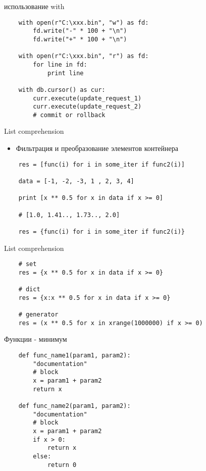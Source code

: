 \documentclass{article}
\begin{document}
\begin{center} использование with \end{center}
\vspace{15pt}
\begin{lstlisting}
	with open(r"C:\xxx.bin", "w") as fd:
	    fd.write("-" * 100 + "\n")
	    fd.write("+" * 100 + "\n")

	with open(r"C:\xxx.bin", "r") as fd:
	    for line in fd:
	    	print line

	with db.cursor() as cur:
	    curr.execute(update_request_1)
	    curr.execute(update_request_2)
		# commit or rollback
\end{lstlisting}
\newpage

\begin{center} List comprehension \end{center}
\vspace{15pt}
\begin{itemize}
	\item Фильтрация и преобразование элементов контейнера
\end{itemize}
\begin{lstlisting}
	res = [func(i) for i in some_iter if func2(i)]

	data = [-1, -2, -3, 1 , 2, 3, 4]

	print [x ** 0.5 for x in data if x >= 0]

	# [1.0, 1.41.., 1.73.., 2.0]

	res = {func(i) for i in some_iter if func2(i)}
\end{lstlisting}
\newpage

\begin{center} List comprehension \end{center}
\begin{lstlisting}
	# set 
	res = {x ** 0.5 for x in data if x >= 0}

	# dict
	res = {x:x ** 0.5 for x in data if x >= 0}

	# generator
	res = (x ** 0.5 for x in xrange(1000000) if x >= 0)
\end{lstlisting}
\newpage

\begin{center} Функции - минимум \end{center}
\begin{lstlisting}
	def func_name1(param1, param2):
		"documentation"
		# block
		x = param1 + param2
		return x

	def func_name2(param1, param2):
		"documentation"
		# block
		x = param1 + param2
		if x > 0:
			return x
		else:
			return 0
\end{lstlisting}
\newpage
\end{document}
